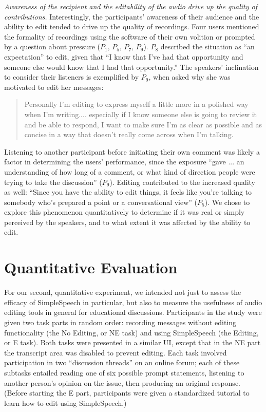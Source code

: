 \emph{Awareness of the recipient and the editability of the audio drive up the quality of contributions.}
Interestingly, the participants' awareness of their audience and the ability to edit tended to drive up the quality of recordings.
Four users mentioned the formality of recordings using the software of their own volition or prompted by a question about pressure ($P_1,\,P_5,\,P_7,\,P_9$). 
$P_8$ described the situation as ``an expectation'' to edit, given that ``I know that I've had that opportunity and someone else would know that I had that opportunity.'' 
The speakers' inclination to consider their listeners is exemplified by $P_9$, when asked why she was motivated to edit her messages:
\begin{quote}
	Personally I'm editing to express myself a little more in a polished way when I'm writing.... especially if I know someone else is going to review it and be able to respond, I want to make sure I'm as clear as possible and as concise in a way that doesn’t really come across when I'm talking.
\end{quote}
Listening to another participant before initiating their own comment was likely a factor in determining the users' performance, since the exposure ``gave ... an understanding of how long of a comment, or what kind of direction people were trying to take the discussion'' ($P_9$). 
Editing contributed to the increased quality as well: ``Since you have the ability to edit things, it feels like you're talking to somebody who's prepared a point or a conversational view'' ($P_5$). 
We chose to explore this phenomenon quantitatively to determine if it was real or simply perceived by the speakers, and to what extent it was affected by the ability to edit.

\section{Quantitative Evaluation}
For our second, quantitative experiment, we intended not just to assess the efficacy of SimpleSpeech in particular, but also to measure the usefulness of audio editing tools in general for educational discussions.
Participants in the study were given two task parts in random order: recording messages without editing functionality (the No Editing, or NE task) and using SimpleSpeech (the Editing, or E task). 
Both tasks were presented in a similar UI, except that in the NE part the transcript area was disabled to prevent editing.
Each task involved participation in two ``discussion threads'' on an online forum; each of these subtasks entailed reading one of six possible prompt statements, listening to another person's opinion on the issue, then producing an original response.
(Before starting the E part, participants were given a standardized tutorial to learn how to edit using SimpleSpeech.)

